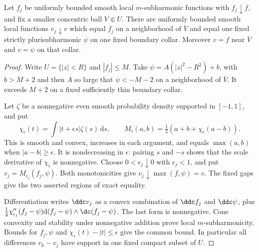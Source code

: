 \begin{lemma}\label{draft621:boundary-localization}
Let $f_j$ be uniformly bounded smooth local $m$-subharmonic functions
with $f_j\downarrow f$, and fix a smaller concentric ball $V\Subset U$.
There are uniformly bounded smooth local functions $v_j\downarrow v$
which equal $f_j$ on a neighborhood of $\overline V$ and equal one
fixed strictly plurisubharmonic $\psi$ on one fixed boundary collar.
Moreover $v=f$ near $\overline V$ and $v=\psi$ on that collar.
\end{lemma}
\begin{proof}
Write $U=\{|z|<R\}$ and $|f_j|\leq M$. Take
$\psi=A(|z|^2-R^2)+b$, with $b>M+2$ and then $A$ so large that
$\psi<-M-2$ on a neighborhood of $\overline V$.
It exceeds $M+2$ on a fixed sufficiently thin boundary collar.

Let $\zeta$ be a nonnegative even smooth probability density
supported in $[-1,1]$, and put
\[
 \chi_\epsilon(t)=\int|t+\epsilon s|\zeta(s)\,\mathrm ds,
 \qquad
 M_\epsilon(a,b)=\tfrac12(a+b+\chi_\epsilon(a-b)).
\]
This is smooth and convex, increases in each argument, and equals
$\max(a,b)$ when $|a-b|\geq\epsilon$. It is nondecreasing in
$\epsilon$: pairing $s$ and $-s$ shows that the scale derivative
of $\chi_\epsilon$ is nonnegative. Choose $0<\epsilon_j\downarrow0$
with $\epsilon_j<1$, and put $v_j=M_{\epsilon_j}(f_j,\psi)$.
Both monotonicities give $v_j\downarrow\max(f,\psi)=v$.
The fixed gaps give the two asserted regions of exact equality.

Differentiation writes $\ddc v_j$ as a convex combination of
$\ddc f_j$ and $\ddc\psi$, plus
$\tfrac12\chi_{\epsilon_j}''(f_j-\psi)
       \mathrm d(f_j-\psi)\wedge\dc(f_j-\psi)$.
The last form is nonnegative. Cone convexity and stability under
nonnegative addition prove local $m$-subharmonicity. Bounds for
$f_j,\psi$ and $\chi_\epsilon(t)-|t|\leq\epsilon$ give the common
bound. In particular all differences $v_k-v_j$ have support in
one fixed compact subset of $U$.
\end{proof}

